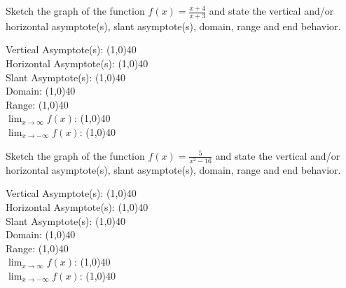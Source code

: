 \documentclass[../main.tex]{subfiles}
\begin{document}
\begin{questions}
    \newpage
    \question[1] Sketch the graph of the function $f(x) = \frac{x+4}{x+3}$ and state the vertical and/or horizontal asymptote(s), slant asymptote(s), domain, range and end behavior.
    
        \begin{left} 
        \end{left}
    
    Vertical Asymptote(s): \line(1,0){40} \\
    \newline
    Horizontal Asymptote(s): \line(1,0){40} \\
    \newline
    Slant Asymptote(s): \line(1,0){40} \\
    \newline
    Domain: \line(1,0){40} \\
    \newline
    Range: \line(1,0){40} \\
    \newline
    $\lim_{x\to\infty} f(x)$: \line(1,0){40} \\
    \newline
    $\lim_{x\to-\infty} f(x)$: \line(1,0){40} \\
    
    \question[1] Sketch the graph of the function $f(x) = \frac{5}{x^2 - 16}$ and state the vertical and/or horizontal asymptote(s), slant asymptote(s), domain, range and end behavior.
    
        \begin{left} 
        \end{left}
    
    Vertical Asymptote(s): \line(1,0){40} \\
    \newline
    Horizontal Asymptote(s): \line(1,0){40} \\
    \newline
    Slant Asymptote(s): \line(1,0){40} \\
    \newline
    Domain: \line(1,0){40} \\
    \newline
    Range: \line(1,0){40} \\
    \newline
    $\lim_{x\to\infty} f(x)$: \line(1,0){40} \\
    \newline
    $\lim_{x\to-\infty} f(x)$: \line(1,0){40} \\
    

\end{questions}
\end{document}
